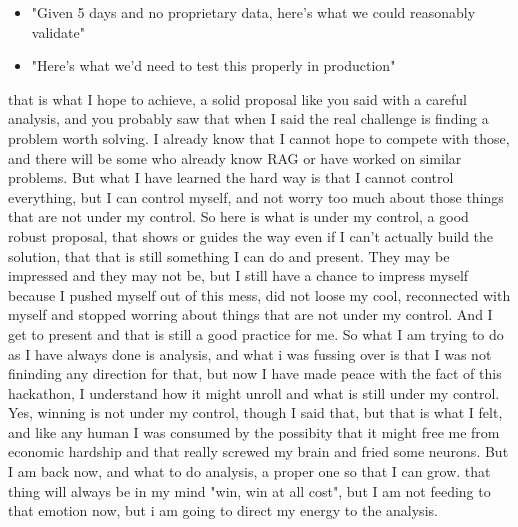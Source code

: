 \begin{botresponse}
\begin{itemize}
\item "Given 5 days and no proprietary data, here's what we could reasonably validate"
\item "Here's what we'd need to test this properly in production"
\end{itemize}
\end{botresponse}

\begin{userprompt}
that is what I hope to achieve, a solid proposal like you said with a careful analysis, and you probably saw that when I said the real challenge is finding a problem worth solving. I already know that I cannot hope to compete with those, and there will be some who already know RAG or have worked on similar problems. But what I have learned the hard way is that I cannot control everything, but I can control myself, and not worry too much about those things that are not under my control. So here is what is under my control, a good robust proposal, that shows or guides the way even if I can't actually build the solution, that that is still something I can do and present. They may be impressed and they may not be, but I still have a chance to impress myself because I pushed myself out of this mess, did not loose my cool, reconnected with myself and stopped worring about things that are not under my control. And I get to present and that is still a good practice for me. So what I am trying to do as I have always done is analysis, and what i was fussing over is that I was not fininding any direction for that, but now I have made peace with the fact of this hackathon, I understand how it might unroll and what is still under my control. Yes, winning is not under my control, though I said that, but that is what I felt, and like any human I was consumed by the possibity that it might free me from economic hardship and that really screwed my brain and fried some neurons. But I am back now, and what to do analysis, a proper one so that I can grow. that thing will always be in my mind "win, win at all cost", but I am not feeding to that emotion now, but i am going to direct my energy to the analysis.
\end{userprompt}


